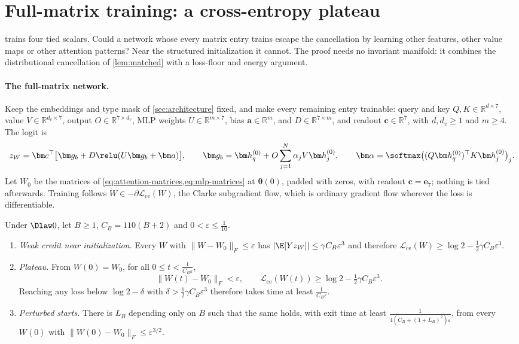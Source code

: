 \section{Full-matrix training: a cross-entropy plateau}
\label{sec:fullmatrix}
 trains four tied scalars. Could a network whose every matrix entry trains escape the cancellation by learning other features,
other value maps or other attention patterns? Near the structured initialization it cannot. The proof needs no invariant manifold:
it combines the distributional cancellation of \cref{lem:matched} with a loss-floor and energy argument.

\paragraph{The full-matrix network.} Keep the embeddings and type mask of \cref{sec:architecture} fixed, and make every remaining entry trainable:
query and key $Q,K\in\mathbb R^{d\times7}$, value $V\in\mathbb R^{d_v\times7}$, output $O\in\mathbb R^{7\times d_v}$, MLP weights $U\in\mathbb R^{m\times7}$, bias $\bm a\in\mathbb R^m$,
and $D\in\mathbb R^{7\times m}$, and readout $\bm c\in\mathbb R^7$, with $d,d_v\ge1$ and $m\ge4$. The logit is
\[
 z_W=\bm c^\top\bigl[\bm g_b+D\relu(U\bm g_b+\bm a)\bigr],\qquad
 \bm g_b=\bm h_q^{(0)}+O\sum_{j=1}^N\alpha_jV\bm h_j^{(0)},\qquad
 \bm\alpha=\softmax\bigl((Q\bm h_q^{(0)})^\top K\bm h_j^{(0)}\bigr)_j .
\]
Let $W_0$ be the matrices of \cref{eq:attention-matrices,eq:mlp-matrices} at $\bm\theta(0)$, padded with zeros, with readout $\bm c=\bm e_7$; nothing is tied afterwards.
Training follows $\dot W\in-\partial\mathcal L_{\mathrm{ce}}(W)$, the Clarke subgradient flow, which is ordinary gradient flow wherever the loss is differentiable.

\begin{mainresult}
\begin{theorem}
\label{thm:fullmatrix}
Under $\Dlaw0$, let $B\ge1$, $C_B=110(B+2)$ and $0<\varepsilon\le\tfrac{1}{10}$.
\begin{enumerate}[label=(\roman*),leftmargin=*,itemsep=2pt,topsep=2pt]
\item \emph{Weak credit near initialization.} Every $W$ with $\|W-W_0\|_F\le\varepsilon$ has
$|\E[Yz_W]|\le\gamma C_B\varepsilon^3$ and therefore $\mathcal L_{\mathrm{ce}}(W)\ge\log2-\tfrac12\gamma C_B\varepsilon^3$.
\item \emph{Plateau.} From $W(0)=W_0$, for all $0\le t<\tfrac{1}{C_B\varepsilon}$,
\[
 \|W(t)-W_0\|_F<\varepsilon,\qquad \mathcal L_{\mathrm{ce}}(W(t))\ge\log2-\tfrac12\gamma C_B\varepsilon^3 .
\]
Reaching any loss below $\log2-\delta$ with $\delta>\tfrac12\gamma C_B\varepsilon^3$ therefore takes time at least $\tfrac{1}{C_B\varepsilon}$.
\item \emph{Perturbed starts.} There is $L_B$ depending only on $B$ such that the same holds, with exit time at least $\tfrac{1}{4(C_B+(1+L_B)^2)\varepsilon}$,
from every $W(0)$ with $\|W(0)-W_0\|_F\le\varepsilon^{3/2}$.
\end{enumerate}
\end{theorem}
\end{mainresult}

